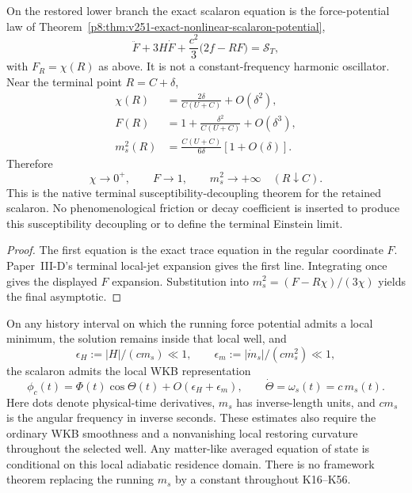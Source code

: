 \documentclass[12pt,a4paper]{article}
\begin{document}
\begin{theorem}
\label{p8:thm:exact-lower-branch-scalaron-oscillator}
On the restored lower branch the exact scalaron equation is the force-potential
law of Theorem~\ref{p8:thm:v251-exact-nonlinear-scalaron-potential},
\begin{equation}
\label{p8:eq:exact-lower-scalaron-oscillator}
 \boxed{\ddot F+3H\dot F+\frac{c^2}{3}\bigl(2f-RF\bigr)
 =\mathcal S_T,}
\end{equation}
with $F_R=\chi(R)$ as above.  It is not a constant-frequency harmonic
oscillator.  Near the terminal point $R=C+\delta$,
\begin{align}
\label{p8:eq:restored-terminal-susceptibility-asymptotic}
 \chi(R)&=\frac{2\delta}{C(U+C)}+O(\delta^2),\\
 F(R)&=1+\frac{\delta^2}{C(U+C)}+O(\delta^3),\\
 m_s^2(R)&=\frac{C(U+C)}{6\delta}[1+O(\delta)].
\end{align}
Therefore
\begin{equation}
\label{p8:eq:restored-terminal-mass-divergence}
 \boxed{\chi\to0^+,\qquad F\to1,\qquad m_s^2\to+\infty
 \quad(R\downarrow C).}
\end{equation}
This is the native terminal susceptibility-decoupling theorem for the retained scalaron.  No phenomenological
friction or decay coefficient is inserted to produce this susceptibility decoupling or to define the terminal Einstein limit.
\end{theorem}

\begin{proof}
The first equation is the exact trace equation in the regular coordinate $F$.
Paper~III-D's terminal local-jet expansion gives the first line.  Integrating
once gives the displayed $F$ expansion.  Substitution into
$m_s^2=(F-R\chi)/(3\chi)$ yields the final asymptotic.
\end{proof}

\begin{corollary}
\label{p8:cor:lower-scalaron-matter-like-average}
On any history interval on which the running force potential admits a local
minimum, the solution remains inside that local well, and
\[
 \epsilon_H:=|H|/(c m_s)\ll1,\qquad
 \epsilon_m:=|\dot m_s|/(c m_s^2)\ll1,
\]
the scalaron admits the local WKB representation
\[
 \phi_c(t)=\Phi(t)\cos\Theta(t)+O(\epsilon_H+\epsilon_m),
 \qquad \dot\Theta=\omega_s(t)=c\,m_s(t).
\]
Here dots denote physical-time derivatives, \(m_s\) has inverse-length
units, and \(c m_s\) is the angular frequency in inverse seconds.
These estimates also require the ordinary WKB smoothness and a nonvanishing
local restoring curvature throughout the selected well.
Any matter-like averaged equation of state is conditional on this local
adiabatic residence domain.  There is no framework theorem replacing the
running $m_s$ by a constant throughout K16--K56.
\end{corollary}
\end{document}
